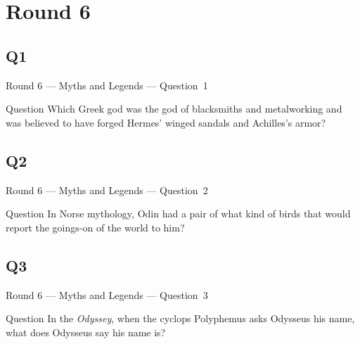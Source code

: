\documentclass[11pt,draft]{beamer}
\begin{document}
\section{Round 6}
\subsection*{Q1}
\begin{frame}[t]{Round 6 --- Myths and Legends --- \mbox{Question 1}}
    \begin{block}{Question}
        Which Greek god was the god of blacksmiths and metalworking and was believed to have forged Hermes' winged sandals and Achilles's armor?
    \end{block}
\end{frame}
\subsection*{Q2}
\begin{frame}[t]{Round 6 --- Myths and Legends --- \mbox{Question 2}}
    \begin{block}{Question}
        In Norse mythology, Odin had a pair of what kind of birds that would report the goings-on of the world to him?
    \end{block}
\end{frame}
\subsection*{Q3}
\begin{frame}[t]{Round 6 --- Myths and Legends --- \mbox{Question 3}}
    \begin{block}{Question}
        In the \emph{Odyssey}, when the cyclops Polyphemus asks Odysseus his name, what does Odysseus say his name is?
    \end{block}
\end{frame}
\end{document}
